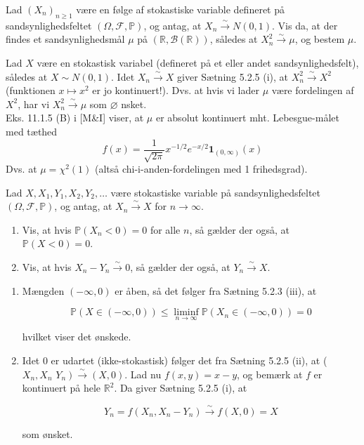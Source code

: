 \documentclass{Class}
\begin{document}
Lad $\left(X_n\right)_{n \geq 1}$ være en følge af stokastiske variable defineret på sandsynlighedsfeltet $(\Omega, \mathcal{F}, \mathbb{P})$, og antag, at $X_n \xrightarrow{\sim} N(0,1)$. Vis da, at der findes et sandsynlighedsmål $\mu$ på $(\mathbb{R}, \mathcal{B}(\mathbb{R}))$, således at $X_n^2 \xrightarrow{\sim} \mu$, og bestem $\mu$.

\solution
Lad $X$ være en stokastisk variabel (defineret på et eller andet sandsynlighedsfelt), således at $X \sim N(0,1)$. Idet $X_n \xrightarrow{\sim} X$ giver Sætning 5.2.5 (i), at $X_n^2 \xrightarrow{\sim} X^2$ (funktionen $x \mapsto x^2$ er jo kontinuert!). Dvs. at hvis vi lader $\mu$ være fordelingen af $X^2$, har vi $X_n^2 \xrightarrow{\sim} \mu$ som $\varnothing$ nsket.
\\Eks. 11.1.5 (B) i [M\&I] viser, at $\mu$ er absolut kontinuert mht. Lebesgue-målet med tæthed
$$
f(x)=\frac{1}{\sqrt{2 \pi}} x^{-1 / 2} e^{-x / 2} \mathbf{1}_{(0, \infty)}(x)
$$
Dvs. at $\mu=\chi^2(1)$ (altså chi-i-anden-fordelingen med 1 frihedsgrad).

Lad $X, X_1, Y_1, X_2, Y_2, \ldots$ være stokastiske variable på sandsynlighedsfeltet $(\Omega, \mathcal{F}, \mathbb{P})$, og antag, at $X_n \xrightarrow{\sim} X$ for $n \rightarrow \infty$.
\begin{enumerate}
    \item Vis, at hvis $\mathbb{P}\left(X_n<0\right)=0$ for alle $n$, så gælder der også, at $\mathbb{P}(X<0)=0$.
    \item Vis, at hvis $X_n-Y_n \xrightarrow{\sim} 0$, så gælder der også, at $Y_n \xrightarrow{\sim} X$.
\end{enumerate}
\solution
\begin{enumerate}
    \item Mængden $(-\infty, 0)$ er åben, så det følger fra Sætning 5.2.3 (iii), at

    $$
    \mathbb{P}(X \in(-\infty, 0)) \leq \liminf _{n \rightarrow \infty} \mathbb{P}\left(X_n \in(-\infty, 0)\right)=0
    $$
    
    hvilket viser det ønskede.
    \item Idet 0 er udartet (ikke-stokastisk) følger det fra Sætning 5.2.5 (ii), at ( $X_n, X_n$ $\left.Y_n\right) \xrightarrow{\sim}(X, 0)$. Lad nu $f(x, y)=x-y$, og bemærk at $f$ er kontinuert på hele $\mathbb{R}^2$. Da giver Sætning 5.2.5 (i), at

    $$
    Y_n=f\left(X_n, X_n-Y_n\right) \xrightarrow{\sim} f(X, 0)=X
    $$
    
    som ønsket.
\end{enumerate}
\end{document}
